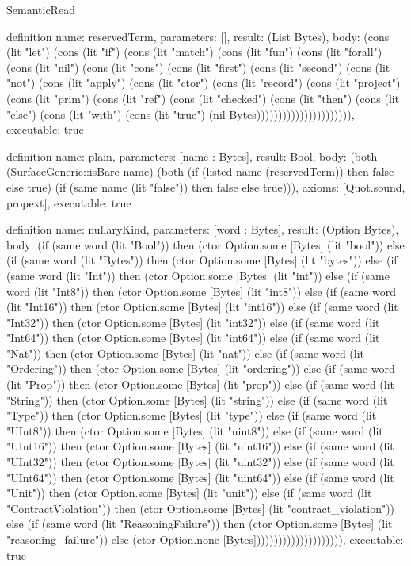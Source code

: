 \begin{lexlean}{SemanticRead}
\begin{semanticmodule}
definition{
  name: reservedTerm,
  parameters: [],
  result: (List Bytes),
  body: (cons (lit "let") (cons (lit "if") (cons (lit "match") (cons (lit "fun") (cons (lit "forall") (cons (lit "nil") (cons (lit "cons") (cons (lit "first") (cons (lit "second") (cons (lit "not") (cons (lit "apply") (cons (lit "ctor") (cons (lit "record") (cons (lit "project") (cons (lit "prim") (cons (lit "ref") (cons (lit "checked") (cons (lit "then") (cons (lit "else") (cons (lit "with") (cons (lit "true") (nil Bytes)))))))))))))))))))))),
  executable: true
}

definition{
  name: plain,
  parameters: [name : Bytes],
  result: Bool,
  body: (both (SurfaceGeneric::isBare name) (both (if (listed name (reservedTerm)) then false else true) (if (same name (lit "false")) then false else true))),
  axioms: [Quot.sound, propext],
  executable: true
}

definition{
  name: nullaryKind,
  parameters: [word : Bytes],
  result: (Option Bytes),
  body: (if (same word (lit "Bool")) then (ctor Option.some [Bytes] (lit "bool")) else (if (same word (lit "Bytes")) then (ctor Option.some [Bytes] (lit "bytes")) else (if (same word (lit "Int")) then (ctor Option.some [Bytes] (lit "int")) else (if (same word (lit "Int8")) then (ctor Option.some [Bytes] (lit "int8")) else (if (same word (lit "Int16")) then (ctor Option.some [Bytes] (lit "int16")) else (if (same word (lit "Int32")) then (ctor Option.some [Bytes] (lit "int32")) else (if (same word (lit "Int64")) then (ctor Option.some [Bytes] (lit "int64")) else (if (same word (lit "Nat")) then (ctor Option.some [Bytes] (lit "nat")) else (if (same word (lit "Ordering")) then (ctor Option.some [Bytes] (lit "ordering")) else (if (same word (lit "Prop")) then (ctor Option.some [Bytes] (lit "prop")) else (if (same word (lit "String")) then (ctor Option.some [Bytes] (lit "string")) else (if (same word (lit "Type")) then (ctor Option.some [Bytes] (lit "type")) else (if (same word (lit "UInt8")) then (ctor Option.some [Bytes] (lit "uint8")) else (if (same word (lit "UInt16")) then (ctor Option.some [Bytes] (lit "uint16")) else (if (same word (lit "UInt32")) then (ctor Option.some [Bytes] (lit "uint32")) else (if (same word (lit "UInt64")) then (ctor Option.some [Bytes] (lit "uint64")) else (if (same word (lit "Unit")) then (ctor Option.some [Bytes] (lit "unit")) else (if (same word (lit "ContractViolation")) then (ctor Option.some [Bytes] (lit "contract_violation")) else (if (same word (lit "ReasoningFailure")) then (ctor Option.some [Bytes] (lit "reasoning_failure")) else (ctor Option.none [Bytes])))))))))))))))))))),
  executable: true
}


\end{semanticmodule}
\end{lexlean}
